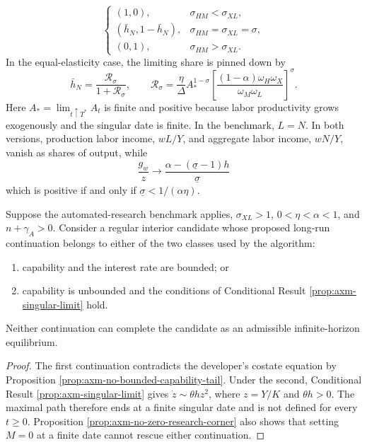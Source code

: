 \begin{conditionalresult}
\begin{equation}
\begin{cases}
  (1,0),&\sigma_{HM}<\sigma_{XL},\\
  (\bar h_N,1-\bar h_N),
      &\sigma_{HM}=\sigma_{XL}=\sigma,\\
  (0,1),&\sigma_{HM}>\sigma_{XL}.
 \end{cases}
 \label{eq:axm-singular-labor-allocation}
\end{equation}
In the equal-elasticity case, the limiting share is pinned down by
\begin{equation}
 \bar h_N=\frac{\mathcal R_\sigma}{1+\mathcal R_\sigma},\qquad
 \mathcal R_\sigma=\frac{\eta}{\Delta}A_*^{1-\sigma}
 \left[
  \frac{(1-\alpha)\omega_H\omega_X}{\omega_M\omega_L}
 \right]^{\sigma}.
 \label{eq:axm-singular-equal-elasticity-share}
\end{equation}
Here \(A_*=\lim_{t\uparrow T^*}A_t\) is finite and positive because labor
productivity grows exogenously and the singular date is finite.
In the benchmark, \(L=N\). In both versions, production labor income,
\(wL/Y\), and aggregate labor income, \(wN/Y\), vanish as shares of output,
while
\begin{equation}
 \frac{g_w}{z}\to
 \frac{\alpha-(\underline\sigma-1)h}{\underline\sigma}
 \label{eq:axm-wage-limit}
\end{equation}
which is positive if and only if
\(\underline\sigma<1/(\alpha\eta)\).
\end{conditionalresult}

\begin{proposition}
\label{prop:axm-no-regular-gross-substitutes-continuation}
Suppose the automated-research benchmark applies, \(\sigma_{XL}>1\),
\(0<\eta<\alpha<1\), and \(n+\gamma_A>0\). Consider a regular interior
candidate whose proposed long-run continuation belongs to either of the two
classes used by the algorithm:
\begin{enumerate}
 \item capability and the interest rate are bounded; or
 \item capability is unbounded and the conditions of Conditional Result
 \ref{prop:axm-singular-limit} hold.
\end{enumerate}
Neither continuation can complete the candidate as an admissible
infinite-horizon equilibrium.
\end{proposition}

\begin{proof}
The first continuation contradicts the developer's costate equation by
Proposition \ref{prop:axm-no-bounded-capability-tail}. Under the second,
Conditional Result \ref{prop:axm-singular-limit} gives
\(\dot z\sim\theta h z^2\), where \(z=Y/K\) and \(\theta h>0\). The maximal
path therefore ends at a finite singular date and is not defined for every
\(t\geq0\). Proposition \ref{prop:axm-no-zero-research-corner} also shows that
setting \(M=0\) at a finite date cannot rescue either continuation.
\end{proof}

